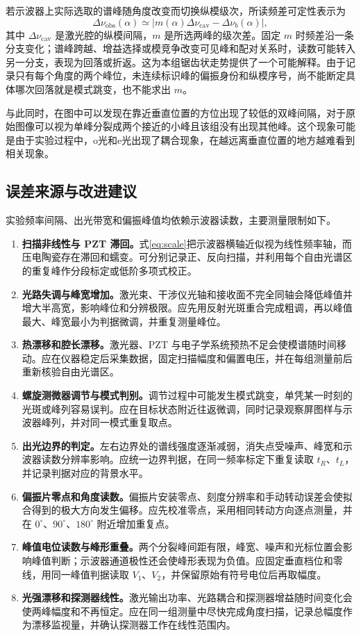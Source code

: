 \documentclass[UTF8,a4paper,10pt]{ctexart}
\begin{document}
若示波器上实际选取的谱峰随角度改变而切换纵模级次，所读频差可定性表示为
\begin{equation}
 \Delta\nu_{\mathrm{obs}}(\alpha)
 \simeq \left|m(\alpha)\Delta\nu_{\mathrm{cav}}-\Delta\nu_b(\alpha)\right|,
 \label{eq:quartz-branch}
\end{equation}
其中 $\Delta\nu_{\mathrm{cav}}$ 是激光腔的纵模间隔，$m$ 是所选两峰的级次差。固定 $m$ 时频差沿一条分支变化；谱峰跨越、增益选择或模竞争改变可见峰和配对关系时，读数可能转入另一分支，表现为回落或折返。这为本组锯齿状走势提供了一个可能解释。由于记录只有每个角度的两个峰位，未连续标识峰的偏振身份和纵模序号，尚不能断定具体哪次回落就是模式跳变，也不能求出 $m$。

与此同时，在图中可以发现在靠近垂直位置的方位出现了较低的双峰间隔，对于原始图像可以视为单峰分裂成两个接近的小峰且该组没有出现其他峰。这个现象可能是由于实验过程中，o光和e光出现了耦合现象，在越远离垂直位置的地方越难看到相关现象。

\subsection{误差来源与改进建议}

实验频率间隔、出光带宽和偏振峰值均依赖示波器读数，主要测量限制如下。

\begin{enumerate}
  \item \textbf{扫描非线性与 PZT 滞回。}式\eqref{eq:scale}把示波器横轴近似视为线性频率轴，而压电陶瓷存在滞回和蠕变。可分别记录正、反向扫描，并利用每个自由光谱区的重复峰作分段标定或低阶多项式校正。
  \item \textbf{光路失调与峰宽增加。}激光束、干涉仪光轴和接收面不完全同轴会降低峰值并增大半高宽，影响峰位和分辨极限。应先用反射光斑重合完成粗调，再以峰值最大、峰宽最小为判据微调，并重复测量峰位。
  \item \textbf{热漂移和腔长漂移。}激光器、PZT 与电子学系统预热不足会使模谱随时间移动。应在仪器稳定后采集数据，固定扫描幅度和偏置电压，并在每组测量前后重新核验自由光谱区。
  \item \textbf{螺旋测微器调节与模式判别。}调节过程中可能发生模式跳变，单凭某一时刻的光斑或峰列容易误判。应在目标状态附近往返微调，同时记录观察屏图样与示波器峰列，并对同一模式重复取点。
  \item \textbf{出光边界的判定。}左右边界处的谱线强度逐渐减弱，消失点受噪声、峰宽和示波器读数分辨率影响。应统一边界判据，在同一频率标定下重复读取 $t_R$、$t_L$，并记录判据对应的背景水平。
  \item \textbf{偏振片零点和角度读数。}偏振片安装零点、刻度分辨率和手动转动误差会使拟合得到的极大方向发生偏移。应先校准零点，采用相同转动方向逐点测量，并在 $0^\circ$、$90^\circ$、$180^\circ$ 附近增加重复点。
  \item \textbf{峰值电位读数与峰形重叠。}两个分裂峰间距有限，峰宽、噪声和光标位置会影响峰值判断；示波器通道极性还会使峰形表现为负值。应固定垂直档位和零线，用同一峰值判据读取 $V_1$、$V_2$，并保留原始有符号电位后再取幅度。
  \item \textbf{光强漂移和探测器线性。}激光输出功率、光路耦合和探测器增益随时间变化会使两峰幅度和不再恒定。应在同一组测量中尽快完成角度扫描，记录总幅度作为漂移监视量，并确认探测器工作在线性范围内。
\end{enumerate}
\end{document}
